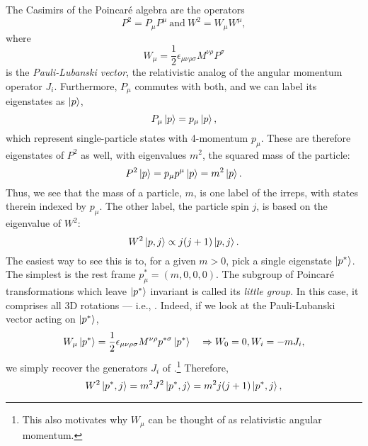 The Casimirs of the Poincaré algebra are the operators
\begin{equation}
	\label{eq:01_poincare_casimirs}
	P^2 = P_\mu P^\mu\ \mathrm{ and }\ W^2 = W_\mu W^\mu,
\end{equation}
where 
\begin{equation}
	\label{eq:01_poincare_wmu}
	W_\mu = \frac{1}{2}\epsilon_{\mu\nu\rho\sigma}M^{\nu\rho}P^\sigma
\end{equation}
is the \textit{Pauli-Lubanski vector}, the relativistic analog of the angular momentum operator $J_i$.
Furthermore, $P_\mu$ commutes with both, and we can label its eigenstates as $\ket{p}$,
\begin{equation}
	\label{eq:01_poincare_pmu_eigenstates}
	P_\mu\ket{p} = p_\mu\ket{p}, 
\end{equation}
which represent single-particle states with 4-momentum $p_\mu$.
These are therefore eigenstates of $P^2$ as well, with eigenvalues $m^2$, the squared mass of the particle:
\begin{equation}
	\label{eq:01_poincare_p2}
	P^2\ket{p} = p_\mu p^\mu\ket{p} = m^2 \ket{p}.
\end{equation}
Thus, we see that the mass of a particle, $m$, is one label of the irreps, with states therein indexed by $p_\mu$.
The other label, the particle spin $j$, is based on the eigenvalue of $W^2$:
\begin{equation}
	\label{eq:01_poincare_w2}
	W^2\ket{p, j} \propto j(j+1)\ket{p, j}.
\end{equation}
The easiest way to see this is to, for a given $m > 0$, pick a single eigenstate $\ket{p^*}$.
The simplest is the rest frame $p^*_\mu = (m, 0, 0, 0)$.
The subgroup of Poincaré transformations which leave $\ket{p^*}$ invariant is called its \textit{little group}.
In this case, it comprises all 3D rotations --- i.e., \SO[3].
Indeed, if we look at the Pauli-Lubanski vector acting on $\ket{p^*}$,
\begin{equation}
	\label{eq:01_poincare_w2_eigenstates}
	W_\mu\ket{p^*} = \frac{1}{2}\epsilon_{\mu\nu\rho\sigma}M^{\nu\rho}p^{*\sigma}\ket{p^*} \quad\Rightarrow W_0 = 0, W_i = -m J_i,
\end{equation}
we simply recover the generators $J_i$ of \so[3].\footnote{This also motivates why $W_\mu$ can be thought of as relativistic angular momentum.}
Therefore,
\begin{equation}
	\label{eq:01_poincare_w2_eigenvalues}
	W^2\ket{p^*, j} = m^2 J^2 \ket{p^*, j} = m^2j(j+1)\ket{p^*, j},
\end{equation}

